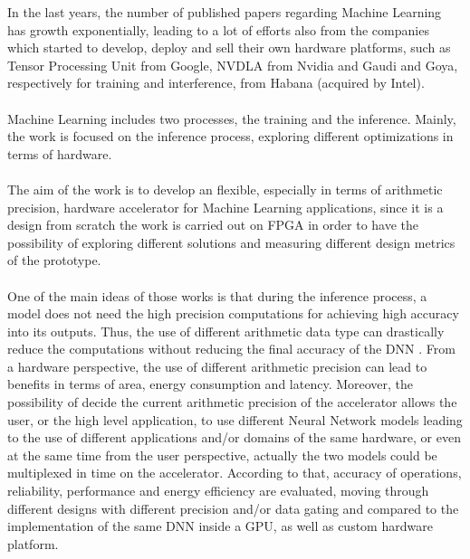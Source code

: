 In the last years, the number of published papers regarding Machine Learning has growth exponentially, leading to a lot of efforts also from the companies which started to develop, deploy and sell their own hardware platforms, such as Tensor Processing Unit \cite{paper:40} from Google, NVDLA\cite{WEBSITE:6} from Nvidia and Gaudi \cite{paper:39} and Goya\cite{paper:38}, respectively for training and interference, from Habana (acquired by Intel).\\\\
Machine Learning includes two processes, the training and the inference. Mainly, the work is focused on the inference process, exploring different optimizations in terms of hardware.\\\\The aim of the work is to develop an flexible, especially in terms of arithmetic precision, hardware accelerator for Machine Learning applications, since it is a design from scratch the work is carried out on FPGA in order to have the possibility of exploring different solutions and measuring different design metrics of the prototype.\\\\
One of the main ideas of those works is that during the inference process, a model does not need the high precision computations \cite{paper:8} \cite{paper:15}for achieving high accuracy into its outputs. Thus, the use of different arithmetic data type can drastically reduce the computations without reducing the final accuracy of the DNN \cite{paper:7} \cite{paper:8}. From a hardware perspective,  the use of different arithmetic precision\cite{paper:14} can lead to benefits in terms of area, energy consumption and latency. Moreover, the possibility of decide the current arithmetic precision of the accelerator allows the user, or the high level application, to use different Neural Network models leading to the use of different  applications and/or domains of the same hardware, or even at the same time from the user perspective, actually the two models could be multiplexed in time on the accelerator.\newline
According to that, accuracy of operations, reliability, performance and energy efficiency are evaluated, moving through different designs with different precision and/or data gating and compared to the implementation of the same DNN inside a GPU, as well as custom hardware platform.


